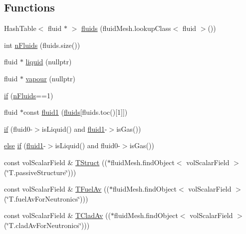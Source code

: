 \subsection*{Functions}
\begin{DoxyCompactItemize}
\item 
Hash\+Table$<$ fluid $\ast$ $>$ \hyperlink{createCouplingFields_8H_aab7f3b688fc17e5b6440cb37ca0ea472}{fluids} (fluid\+Mesh.\+lookup\+Class$<$ fluid $>$())
\item 
int \hyperlink{createCouplingFields_8H_aefb70aedd21e8101464b43825a5eb8de}{n\+Fluids} (fluids.\+size())
\item 
fluid $\ast$ \hyperlink{createCouplingFields_8H_a34b77427a2a1bf413f5cdae437e3d7ef}{liquid} (nullptr)
\item 
fluid $\ast$ \hyperlink{createCouplingFields_8H_ae4c60b2c622bfb2cb70d8694152c0338}{vapour} (nullptr)
\item 
\hyperlink{createCouplingFields_8H_ac6ff4a23a9f1a45f8b64a2928a2a12c0}{if} (\hyperlink{createCouplingFields_8H_aefb70aedd21e8101464b43825a5eb8de}{n\+Fluids}==1)
\item 
fluid $\ast$const \hyperlink{createCouplingFields_8H_a25f7a0918d80e813426eef4229632ba7}{fluid1} (\hyperlink{createCouplingFields_8H_aab7f3b688fc17e5b6440cb37ca0ea472}{fluids}\mbox{[}fluids.\+toc()\mbox{[}1\mbox{]}\mbox{]})
\item 
\hyperlink{createCouplingFields_8H_af2200cc2fa50d4fe7f33e4a35d9e3c67}{if} (fluid0-\/$>$is\+Liquid() and \hyperlink{createCouplingFields_8H_a25f7a0918d80e813426eef4229632ba7}{fluid1}-\/$>$is\+Gas())
\item 
\hyperlink{createFluidMesh_8H_a0544c3fe466e421738dae463968b70ba}{else} \hyperlink{createCouplingFields_8H_a887e853cfccd45a56eb1c71dd59c7101}{if} (\hyperlink{createCouplingFields_8H_a25f7a0918d80e813426eef4229632ba7}{fluid1}-\/$>$is\+Liquid() and fluid0-\/$>$is\+Gas())
\item 
const vol\+Scalar\+Field \& \hyperlink{createCouplingFields_8H_aff59c849e5a7c616f1bc0bb46332f5a3}{T\+Struct} (($\ast$fluid\+Mesh.\+find\+Object$<$ vol\+Scalar\+Field $>$(\char`\"{}T.\+passive\+Structure\char`\"{})))
\item 
const vol\+Scalar\+Field \& \hyperlink{createCouplingFields_8H_a455928a9b9a6967eec66e04552cde9b2}{T\+Fuel\+Av} (($\ast$fluid\+Mesh.\+find\+Object$<$ vol\+Scalar\+Field $>$(\char`\"{}T.\+fuel\+Av\+For\+Neutronics\char`\"{})))
\item 
const vol\+Scalar\+Field \& \hyperlink{createCouplingFields_8H_a147e25b01d60335208bee4349bba2474}{T\+Clad\+Av} (($\ast$fluid\+Mesh.\+find\+Object$<$ vol\+Scalar\+Field $>$(\char`\"{}T.\+clad\+Av\+For\+Neutronics\char`\"{})))

\end{DoxyCompactItemize}
